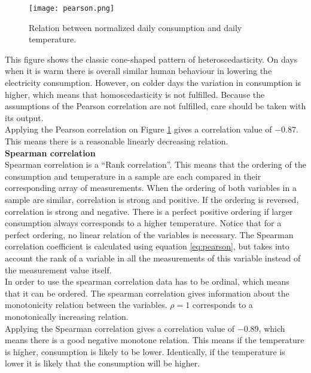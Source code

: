 \begin{figure}[h!]
	\centering
	\texttt{[image: pearson.png]}
	\caption{Relation between normalized daily consumption and daily temperature.}
	\label{fig:pearson}
\end{figure}

This figure shows the classic cone-shaped pattern of heteroscedasticity. On days when it is warm there is overall similar human behaviour in lowering the electricity consumption. However, on colder days the variation in consumption is higher, which means that homoscedasticity is not fulfilled. Because the assumptions of the Pearson correlation are not fulfilled, care should be taken with its output.\\

Applying the Pearson correlation on Figure \ref{fig:pearson} gives a correlation value of $ -0.87 $. This means there is a reasonable linearly decreasing relation.\\


\textbf{Spearman correlation}\\
Spearman correlation is a ``Rank correlation''. This means that the ordering of the consumption and temperature in a sample are each compared in their corresponding array of measurements.  When the ordering of both variables in a sample are similar, correlation is strong and positive. If the ordering is reversed, correlation is strong and negative. There is a perfect positive ordering if larger consumption always corresponds to a higher temperature. Notice that for a perfect ordering, no linear relation of the variables is necessary. The Spearman correlation coefficient is calculated using equation \ref{eq:pearson}, but takes into account the rank of a variable in all the measurements of this variable instead of the measurement value itself.\\

In order to use the spearman correlation data has to be ordinal, which means that it can be ordered. The spearman correlation gives information about the monotonicity relation between the variables. $ \rho = 1 $ corresponds to a monotonically increasing relation.\\

Applying the Spearman correlation  gives a correlation value of $ -0.89$, which means there is a good negative monotone relation. This means if the temperature is higher, consumption is likely to be lower. Identically, if the temperature is lower it is likely that the consumption will be higher. \\

